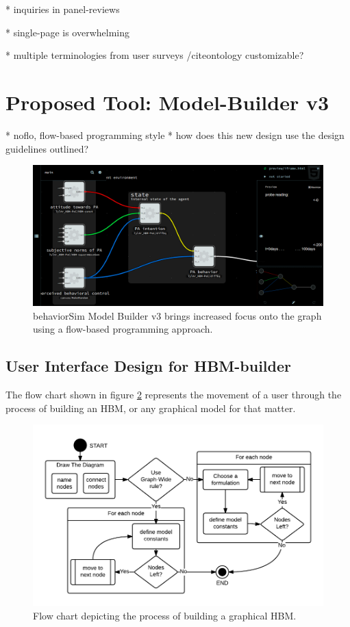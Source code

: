 \documentclass[conference]{IEEEtran}
\begin{document}
* inquiries in panel-reviews

* single-page is overwhelming 

* multiple terminologies from user surveys /cite{ontology} customizable? 





\section{Proposed Tool: Model-Builder v3}
* noflo, flow-based programming style
* how does this new design use the design guidelines outlined?

\begin{figure}[!t]
  \centering
  \includegraphics[width=0.9\columnwidth]{img/v3}  
  \caption{behaviorSim Model Builder v3 brings increased focus onto the graph using a flow-based programming approach.}
  \label{model-builder-v3}
\end{figure}


\subsection{User Interface Design for HBM-builder }
The flow chart shown in figure \ref{HBM-build-process} represents the movement of a user through the process of building an HBM, or any graphical model for that matter.

\begin{figure}[!t]
  \centering
  \includegraphics[width=0.9\columnwidth]{img/HBM-build-process}
  \caption{Flow chart depicting the process of building a graphical HBM.}
  \label{HBM-build-process}
\end{figure}
\end{document}
